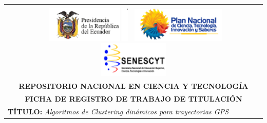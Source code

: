 \documentclass[12pt, a4paper, nofontenc, numbers=endperiod]{apa7}
\begin{document}
	{ %
		
		\section*{}
		\begin{center}
			{\renewcommand{\arraystretch}{2}		
				\centering \singlespacing
				\begin{tabular}{|p{1.5cm} l|l|}  
					\hline
					\multicolumn{3}{|l|}{}\\
					\multicolumn{3}{|c|}{
						
						\includegraphics[width=4.5cm,height=1.7cm]{Imagenes/Figura3}
						\includegraphics[width=4.5cm,height=1.7cm]{Imagenes/Figura4}
						\includegraphics[width=4.5cm,height=1.7cm]{Imagenes/Figura5}}  \\
					\hline
					\multicolumn{3}{|c|}{\textbf{\footnotesize REPOSITORIO NACIONAL EN CIENCIA Y TECNOLOGÍA}}\\
					\hline
					\multicolumn{3}{|c|}{\textbf{\footnotesize FICHA DE REGISTRO DE TRABAJO DE TITULACIÓN}}\\
					
					\hline
					
					\multicolumn{3}{|p{15cm}|}{\textbf{TÍTULO: }\textit{Algoritmos de Clustering dinámicos para trayectorias GPS}}  \\
					
					\hline
					

\end{tabular}}
\end{center}}
\end{document}
